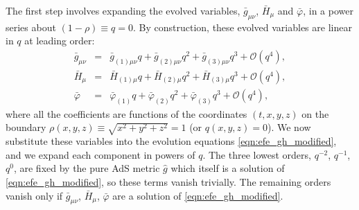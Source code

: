 \documentclass[a4paper,11pt]{article}
\numberwithin{equation}{section}
\begin{document}
The first step involves expanding the evolved variables, $\bar{g}_{\mu \nu}$, $\bar{H}_{\mu}$ and $\bar{\varphi}$, in a power series about $(1-\rho) \equiv q = 0$. 
By construction, these evolved variables are linear in $q$ at leading order:
\begin{eqnarray}\label{eqn:qexp}
\bar{g}_{\mu \nu} &=& \bar{g}_{(1) \mu \nu} q + \bar{g}_{(2) \mu \nu} q^2 + \bar{g}_{(3) \mu \nu} q^3 + \mathcal{O}(q^4), \label{eqn:qexpg} \\
\bar{H}_{\mu} &=& \bar{H}_{(1) \mu} q + \bar{H}_{(2) \mu} q^2 + \bar{H}_{(3) \mu} q^3 + \mathcal{O}(q^4) ,\label{eqn:qexpH}\\
\bar{\varphi} &=& \bar{\varphi}_{(1)} q + \bar{\varphi}_{(2)} q^2 + \bar{\varphi}_{(3)} q^3 + \mathcal{O}(q^4), \label{eqn:qexpphi}
\end{eqnarray}
where all the coefficients are functions of the coordinates $(t,x,y,z)$ on the boundary $\rho(x,y,z)\equiv\sqrt{x^2+y^2+z^2}=1$ (or $q(x,y,z)=0$).
We now substitute these variables into the evolution equations \eqref{eqn:efe_gh_modified}, and we expand each component in powers of $q$. The three lowest orders, $q^{-2}$, $q^{-1}$, $q^0$, are fixed by the pure AdS metric $\hat{g}$ which itself is a solution of \eqref{eqn:efe_gh_modified}, so these terms vanish trivially. The remaining orders vanish only if $\bar{g}_{\mu \nu}$, $\bar{H}_{\mu}$, $\bar{\varphi}$ are a solution of \eqref{eqn:efe_gh_modified}.
\end{document}
